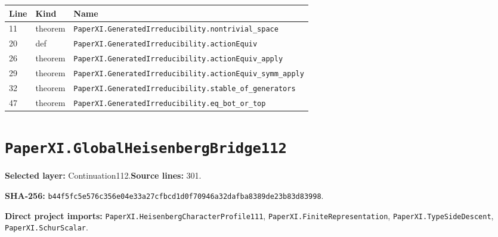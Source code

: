 \documentclass[10pt,oneside]{book}
\begin{document}
\begin{longtable}{@{}p{}p{}p{}@{}}\toprule Line&Kind&Name\\\midrule\endhead

11&theorem&\nolinkurl{PaperXI.GeneratedIrreducibility.nontrivial_space}\\

20&def&\nolinkurl{PaperXI.GeneratedIrreducibility.actionEquiv}\\

26&theorem&\nolinkurl{PaperXI.GeneratedIrreducibility.actionEquiv_apply}\\

29&theorem&\nolinkurl{PaperXI.GeneratedIrreducibility.actionEquiv_symm_apply}\\

32&theorem&\nolinkurl{PaperXI.GeneratedIrreducibility.stable_of_generators}\\

47&theorem&\nolinkurl{PaperXI.GeneratedIrreducibility.eq_bot_or_top}\\

\bottomrule\end{longtable}

\section{\texorpdfstring{\nolinkurl{PaperXI.GlobalHeisenbergBridge112}}{PaperXI.GlobalHeisenbergBridge112}}\label{module:PaperXI.GlobalHeisenbergBridge112}

\textbf{Selected layer:} Continuation112.\quad\textbf{Source lines:} 301.\par\textbf{SHA-256:} {\scriptsize\nolinkurl{b44f5fc5e576c356e04e33a27cfbcd1d0f70946a32dafba8389de23b83d83998}}.


\textbf{Direct project imports:} \nolinkurl{PaperXI.HeisenbergCharacterProfile111}, \nolinkurl{PaperXI.FiniteRepresentation}, \nolinkurl{PaperXI.TypeSideDescent}, \nolinkurl{PaperXI.SchurScalar}.
\end{document}

